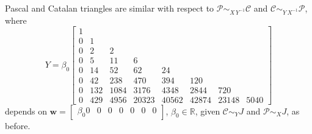 \begin{example}
Pascal and Catalan triangles are similar with respect to
$\mathcal{P} \sim_{X\,Y^{-1}}\mathcal{C}$ and $\mathcal{C}
\sim_{Y\,X^{-1}}\mathcal{P}$, where
\begin{displaymath}
Y = \beta_{0} \left[\begin{matrix}1 &  &  &  &  &  &  & \\0 & 1 &  &  &  &  &  & \\0 & 2 & 2 &  &  &  &  & \\0 & 5 & 11 & 6 &  &  &  & \\0 & 14 & 52 & 62 & 24 &  &  & \\0 & 42 & 238 & 470 & 394 & 120 &  & \\0 & 132 & 1084 & 3176 & 4348 & 2844 & 720 & \\0 & 429 & 4956 & 20323 & 40562 & 42874 & 23148 & 5040\end{matrix}\right]
\end{displaymath}
depends on $\displaystyle\boldsymbol{w}= \left[\begin{matrix} \beta_{0} 0 & 0 & 0 & 0 & 0 & 0 & 0 \end{matrix}\right]$, $\beta_{0}\in\mathbb{R}$,
given $\mathcal{C}\sim_{Y}J$ and $\mathcal{P}\sim_{X}J$, as before.
\end{example}


